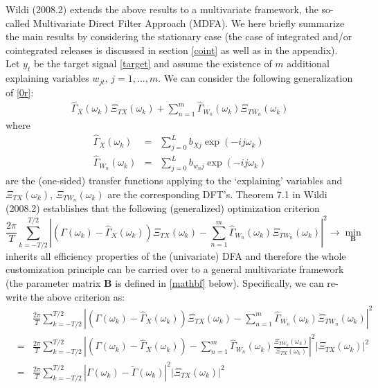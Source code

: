 \documentclass[11pt]{article}
\begin{document}
Wildi (2008.2) extends the above results to a multivariate framework, the so-called Multivariate Direct Filter Approach (MDFA).  We here briefly summarize the main results by considering the stationary case (the case of integrated and/or cointegrated releases is discussed in section \ref{coint} as well as in the appendix).  Let $y_t$ be the target signal \ref{target} and assume the existence of $m$ additional explaining variables $w_{jt}$, $j=1,...,m$. We can consider the following generalization of \ref{0r}:
\begin{eqnarray}
\hat{\Gamma}_X(\omega_k)\Xi_{T
X}(\omega_k)+\sum_{n=1}^m
\hat{\Gamma}_{W_n}(\omega_k)\Xi_{TW_n}(\omega_k)\label{statcase}
\end{eqnarray}
where
\begin{eqnarray*}
\hat{\Gamma}_X(\omega_k)&=&\sum_{j=0}^Lb_{Xj} \exp(-ij\omega_k)\\
\hat{\Gamma}_{W_n}(\omega_k)&=&\sum_{j=0}^Lb_{w_nj} \exp(-ij\omega_k)
\end{eqnarray*}
are the (one-sided) transfer functions applying to the `explaining' variables and $\Xi_{TX}(\omega_k)$, $\Xi_{TW_n}(\omega_k)$ are the corresponding DFT's. Theorem 7.1 in Wildi (2008.2) establishes that the following (generalized) optimization criterion
\begin{equation}\label{dfanv1}
\frac{2\pi}{T} \sum_{k=-T/2}^{T/2}
\left|\left(\Gamma(\omega_k)-\hat{\Gamma}_X(\omega_k)\right)\Xi_{T
X}(\omega_k)-\sum_{n=1}^m
\hat{\Gamma}_{W_n}(\omega_k)\Xi_{TW_n}(\omega_k)\right|^2 \to \min_{\mathbf{B}}
\end{equation}
inherits all efficiency properties of the (univariate) DFA and therefore the whole customization principle can be carried over to a general multivariate framework (the parameter matrix  $\mathbf{B}$ is defined in \ref{mathbf} below). Specifically, we can re-write the above criterion as:
\begin{eqnarray}
&&\frac{2\pi}{T} \sum_{k=-T/2}^{T/2}
\left|\left(\Gamma(\omega_k)-\hat{\Gamma}_X(\omega_k)\right)\Xi_{T
X}(\omega_k)-\sum_{n=1}^m
\hat{\Gamma}_{W_n}(\omega_k)\Xi_{TW_n}(\omega_k)\right|^2 \nonumber\\
&=&\frac{2\pi}{T} \sum_{k=-T/2}^{T/2}
\left|\left(\Gamma(\omega_k)-\hat{\Gamma}_X(\omega_k)\right)-\sum_{n=1}^m
\hat{\Gamma}_{W_n}(\omega_k)\frac{\Xi_{TW_n}(\omega_k)}{\Xi_{T
X}(\omega_k)}\right|^2\left|\Xi_{T
X}(\omega_k)\right|^2 \nonumber\\
&=&\frac{2\pi}{T} \sum_{k=-T/2}^{T/2}
\left|\Gamma(\omega_k)-\tilde{\Gamma}(\omega_k)\right|^2\left|\Xi_{T
X}(\omega_k)\right|^2\label{dftp2}
\end{eqnarray}
\end{document}
